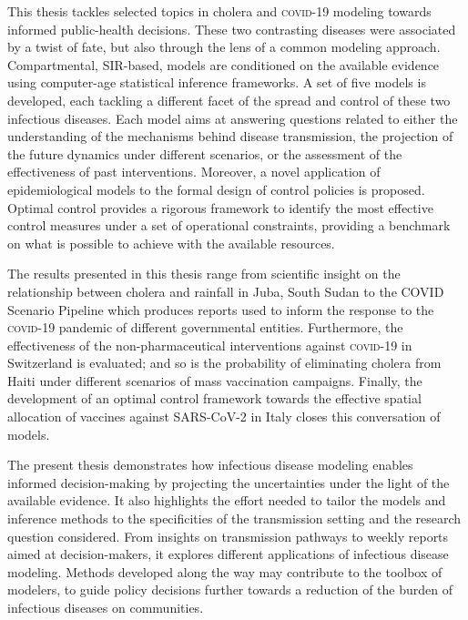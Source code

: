 This thesis tackles selected topics in cholera and \textsc{covid}-19 modeling towards informed public-health decisions. These two contrasting diseases were associated by a twist of fate, but also through the lens of a common modeling approach.  Compartmental, SIR-based, models are conditioned on the available evidence using computer-age statistical inference frameworks. A set of five models is developed, each tackling a different facet of the spread and control of these two infectious diseases. Each model aims at answering questions related to either the understanding of the mechanisms behind disease transmission, the projection of the future dynamics under different scenarios, or the assessment of the effectiveness of past interventions. Moreover, a novel application of epidemiological models to the formal design of control policies is proposed. Optimal control provides a rigorous framework to identify the most effective control measures under a set of operational constraints, providing a benchmark on what is possible to achieve with the available resources.

The results presented in this thesis range from scientific insight on the relationship between cholera and rainfall in Juba, South Sudan to the COVID Scenario Pipeline which produces reports used to inform the response to the \textsc{covid}-19 pandemic of different governmental entities. Furthermore, the effectiveness of the non-pharmaceutical interventions against \textsc{covid}-19 in Switzerland is evaluated; and so is the probability of eliminating cholera from Haiti under different scenarios of mass vaccination campaigns. Finally, the development of an optimal control framework towards the effective spatial allocation of vaccines against SARS-CoV-2 in Italy closes this conversation of models.

The present thesis demonstrates how infectious disease modeling enables informed decision-making by projecting the uncertainties under the light of the available evidence. It also highlights the effort needed to tailor the models and inference methods to the specificities of the transmission setting and the research question considered. From insights on transmission pathways to weekly reports aimed at decision-makers, it explores different applications of infectious disease modeling. Methods developed along the way may contribute to the toolbox of modelers, to guide policy decisions further towards a reduction of the burden of infectious diseases on communities.


